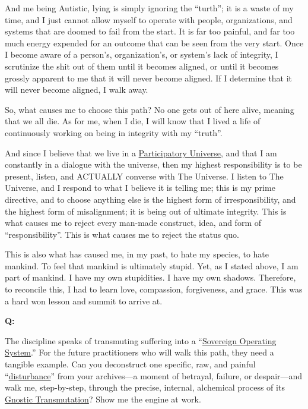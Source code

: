 \documentclass{article}
\begin{document}
And me being Autistic, lying is simply ignoring the ``turth''; it is a waste of my time, and I just cannot allow myself to operate with people, organizations, and systems that are doomed to fail from the start. It is far too painful, and far too much energy expended for an outcome that can be seen from the very start. Once I become aware of a person's, organization's, or system's lack of integrity, I scrutinize the shit out of them until it becomes aligned, or until it becomes grossly apparent to me that it will never become aligned. If I determine that it will never become aligned, I walk away.

So, what causes me to choose this path? No one gets out of here alive, meaning that we all die. As for me, when I die, I will know that I lived a life of continuously working on being in integrity with my ``truth''.

And since I believe that we live in a \hyperlink{gloss:participatory_universe}{Participatory Universe}, and that I am constantly in a dialogue with the universe, then my highest responsibility is to be present, listen, and ACTUALLY converse with The Universe. I listen to The Universe, and I respond to what I believe it is telling me; this is my prime directive, and to choose anything else is the highest form of irresponsibility, and the highest form of misalignment; it is being out of ultimate integrity. This is what causes me to reject every man-made construct, idea, and form of ``responsibility''. This is what causes me to reject the status quo.

This is also what has caused me, in my past, to hate my species, to hate mankind. To feel that mankind is ultimately stupid. Yet, as I stated above, I am part of mankind. I have my own stupidities. I have my own shadows. Therefore, to reconcile this, I had to learn love, compassion, forgiveness, and grace. This was a hard won lesson and summit to arrive at.

\textbf{Q:}

The discipline speaks of transmuting suffering into a ``\hyperlink{gloss:sovereign_operating_system}{Sovereign Operating System}.'' For the future practitioners who will walk this path, they need a tangible example. Can you deconstruct one specific, raw, and painful ``\hyperlink{gloss:disturbance}{disturbance}'' from your archives---a moment of betrayal, failure, or despair---and walk me, step-by-step, through the precise, internal, alchemical process of its \hyperlink{gloss:gnostic_transmutation}{Gnostic Transmutation}? Show me the engine at work.
\end{document}

